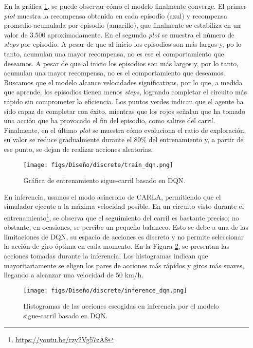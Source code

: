 En la gráfica \ref{fig:train_dqn}, se puede observar cómo el modelo finalmente converge. El primer \textit{plot} muestra la recompensa obtenida en cada episodio (azul) y recompensa promedio acumulada por episodio (amarillo), que finalmente se estabiliza en un valor de 3.500 aproximadamente. En el segundo \textit{plot} se muestra el número de \textit{steps} por episodio. A pesar de que al inicio los episodios son más largos y, po lo tanto, acumulan una mayor recompensa, no es ese el comportamiento que deseamos. A pesar de que al inicio los episodios son más largos y, por lo tanto, acumulan una mayor recompensa, no es el comportamiento que deseamos. Buscamos que el modelo alcance velocidades significativas, por lo que, a medida que aprende, los episodios tienen menos \textit{steps}, logrando completar el circuito más rápido sin comprometer la eficiencia. Los puntos verdes indican que el agente ha sido capaz de completar con éxito, mientras que los rojos señalan que ha tomado una acción que ha provocado el fin del episodio, como salirse del carril. Finalmente, en el último \textit{plot} se muestra cómo evoluciona el ratio de exploración, su valor se reduce gradualmente durante el 80\% del entrenamiento y, a partir de ese punto, se dejan de realizar acciones aleatorias.
\begin{figure}[ht]
  \centering
  \texttt{[image: figs/Diseño/discrete/train\_dqn.png]}
  \caption{Gráfica de entrenamiento sigue-carril basado en \ac{DQN}.}
  \label{fig:train_dqn}
\end{figure}

En inferencia, usamos el modo asíncrono de CARLA, permitiendo que el simulador ejecute a la máxima velocidad posible. En un circuito visto durante el entrenamiento\footnote{\url{https://youtu.be/rzy2Vg57zA8}}, se observa que el seguimiento del carril es bastante preciso; no obstante, en ocasiones, se percibe un pequeño balanceo. Esto se debe a una de las limitaciones de \ac{DQN}, su espacio de acciones es discreto y no permite seleccionar la acción de giro óptima en cada momento. En la Figura \ref{fig:inference_dqn}, se presentan las acciones tomadas durante la inferencia. Los histogramas indican que mayoritariamente se eligen los pares de acciones más rápidos y giros más suaves, llegando a alcanzar una velocidad de 50 km/h.

\begin{figure}[ht]
\centering
\texttt{[image: figs/Diseño/discrete/inference\_dqn.png]}
\caption{Histogramas de las acciones escogidas en inferencia por el modelo sigue-carril basado en \ac{DQN}.}
\label{fig:inference_dqn}
\end{figure}

